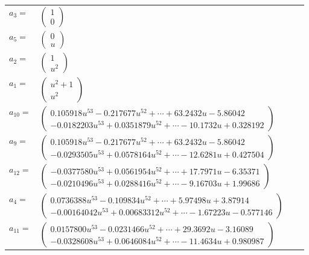 \documentclass[1p]{elsarticle_modified}
\theoremstyle{definition}
\begin{document}
\begin{tabular}{m{7pt} m{180pt} m{7pt} m{180pt} }
\flushright $a_{3}=$&$\begin{pmatrix}1\\0\end{pmatrix}$ \\
\flushright $a_{5}=$&$\begin{pmatrix}0\\u\end{pmatrix}$ \\
\flushright $a_{2}=$&$\begin{pmatrix}1\\u^2\end{pmatrix}$ \\
\flushright $a_{1}=$&$\begin{pmatrix}u^2+1\\u^2\end{pmatrix}$ \\
\flushright $a_{10}=$&$\begin{pmatrix}0.105918 u^{53}-0.217677 u^{52}+\cdots+63.2432 u-5.86042\\-0.0182203 u^{53}+0.0351879 u^{52}+\cdots-10.1732 u+0.328192\end{pmatrix}$ \\
\flushright $a_{9}=$&$\begin{pmatrix}0.105918 u^{53}-0.217677 u^{52}+\cdots+63.2432 u-5.86042\\-0.0293505 u^{53}+0.0578164 u^{52}+\cdots-12.6281 u+0.427504\end{pmatrix}$ \\
\flushright $a_{12}=$&$\begin{pmatrix}-0.0377580 u^{53}+0.0561954 u^{52}+\cdots+17.7971 u-6.35371\\-0.0210496 u^{53}+0.0288416 u^{52}+\cdots-9.16703 u+1.99686\end{pmatrix}$ \\
\flushright $a_{4}=$&$\begin{pmatrix}0.0736388 u^{53}-0.109834 u^{52}+\cdots+5.97498 u+3.87914\\-0.00164042 u^{53}+0.00683312 u^{52}+\cdots-1.67223 u-0.577146\end{pmatrix}$ \\
\flushright $a_{11}=$&$\begin{pmatrix}0.0157800 u^{53}-0.0231466 u^{52}+\cdots+29.3692 u-3.16089\\-0.0328608 u^{53}+0.0646084 u^{52}+\cdots-11.4634 u+0.980987\end{pmatrix}$ \\

\end{tabular}
\end{document}

